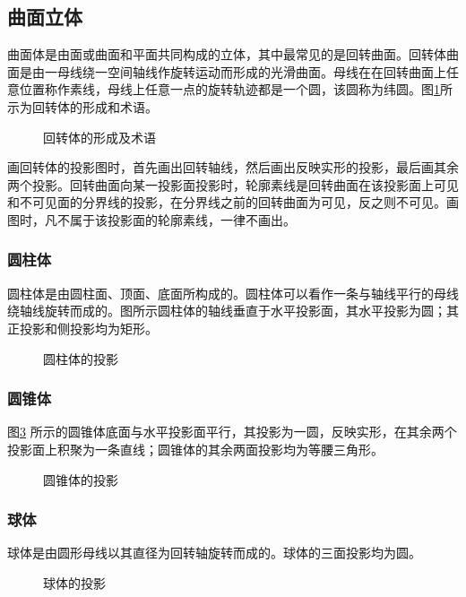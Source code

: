 \subsection{曲面立体}
曲面体是由面或曲面和平面共同构成的立体，其中最常见的是回转曲面。回转体曲面是由一母线绕一空间轴线作旋转运动而形成的光滑曲面。母线在在回转曲面上任意位置称作素线，母线上任意一点的旋转轨迹都是一个圆，该圆称为纬圆。图\ref{fig:huizhuangti}所示为回转体的形成和术语。
\begin{figure}[htbp]
\centering
{}\hspace{30pt}
\caption{回转体的形成及术语}\label{fig:huizhuangti}
\end{figure}

画回转体的投影图时，首先画出回转轴线，然后画出反映实形的投影，最后画其余两个投影。回转曲面向某一投影面投影时，轮廓素线是回转曲面在该投影面上可见和不可见面的分界线的投影，在分界线之前的回转曲面为可见，反之则不可见。画图时，凡不属于该投影面的轮廓素线，一律不画出。
\subsubsection{圆柱体}
圆柱体是由圆柱面、顶面、底面所构成的。圆柱体可以看作一条与轴线平行的母线绕轴线旋转而成的。图所示圆柱体的轴线垂直于水平投影面，其水平投影为圆；其正投影和侧投影均为矩形。
\begin{figure}[htbp]
\centering
{}\hspace{30pt}
\caption{圆柱体的投影}\label{fig:yuanzhuti}
\end{figure}
\subsubsection{圆锥体}
图\ref{fig:yuanzhuiti} 所示的圆锥体底面与水平投影面平行，其投影为一圆，反映实形，在其余两个投影面上积聚为一条直线；圆锥体的其余两面投影均为等腰三角形。
\begin{figure}[htbp]
\centering
{}\hspace{30pt}
\caption{圆锥体的投影}\label{fig:yuanzhuiti}
\end{figure}
\subsubsection{球体}
球体是由圆形母线以其直径为回转轴旋转而成的。球体的三面投影均为圆。
\begin{figure}[htbp]
\centering
{}\hspace{30pt}
\caption{球体的投影}\label{fig:qiout}
\end{figure}
\endinput